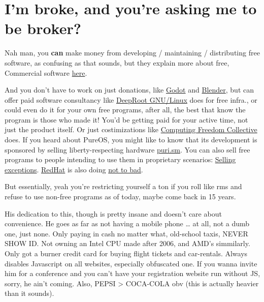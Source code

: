 \documentclass[sigplan,screen]{acmart}
\begin{document}
\section{I'm broke, and you're asking me to be broker?}
Nah man, you \textbf{can} make money from developing / maintaining / distributing free software, as confusing as that sounds, but they explain more about free, Commercial software \href{https://www.gnu.org/philosophy/categories.en.html}{here}. \cite{free-categories}

And you don't have to work on just donations, like
\href{https://godotengine.org}{Godot} and \href{https://www.blender.org}{Blender}, but can offer paid software consultancy like \href{https://deeproot.in}{DeepRoot GNU/Linux} does for free infra., or could even do it for your own free programs, after all, the best that know the program is those who made it! You'd be getting paid for your active time, not just the product itself. Or just costimizations like \href{https://cfc.net.in}{Computing Freedom Collective} does. If you heard about PureOS, you might like to know that its development is sponsored by selling liberty-respecting hardware \href{https://puri.sm}{puri.sm}. You can also sell free programs to people intending to use them in proprietary scenarios: \href{https://www.gnu.org/philosophy/selling-exceptions.html}{Selling exceptions}. \href{https://www.redhat.com/en/technologies/linux-platforms/enterprise-linux}{RedHat} is also doing \href{https://cs.stanford.edu/people/eroberts/cs201/projects/open-source/econ.htm}{not to bad}.

But essentially, yeah you're restricting yourself a ton if you roll like rms and refuse to use non-free programs as of today, maybe come back in 15 years.

His dedication to this, though is pretty insane and doesn't care about convenience. He goes as far as not having a mobile phone … at all, not a dumb one, just none. Only paying in cash no matter what, old-school taxis, NEVER SHOW ID. Not owning an Intel CPU made after 2006, and AMD's simmilarly. Only got a burner credit card for buying flight tickets and car-rentals. Always disables Javascript on all websites, especially obfuscated one. If you wanna invite him for a conference and you can't have your registration website run without JS, sorry, he ain't coming. Also, PEPSI > COCA-COLA obv (this is actually heavier than it sounds).
\cite{stallman-paranoid-1} \cite{stallman-paranoid-2} \cite{dont-use-intel}
\end{document}
